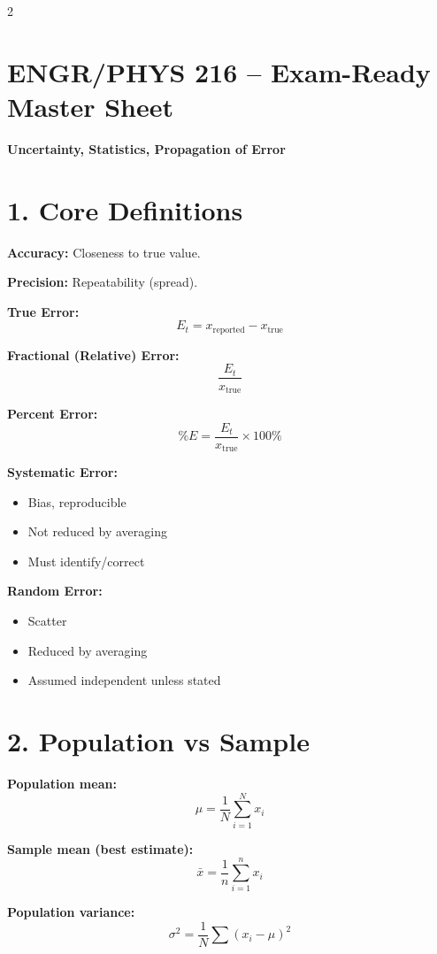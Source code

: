 \documentclass[10pt,landscape]{article}
\begin{document}
\begin{multicols}{2}

\section*{ENGR/PHYS 216 – Exam-Ready Master Sheet}
\textbf{Uncertainty, Statistics, Propagation of Error}

\section*{1. Core Definitions}

\textbf{Accuracy:} Closeness to true value.

\textbf{Precision:} Repeatability (spread).

\textbf{True Error:}
\[
E_t = x_{\text{reported}} - x_{\text{true}}
\]

\textbf{Fractional (Relative) Error:}
\[
\frac{E_t}{x_{\text{true}}}
\]

\textbf{Percent Error:}
\[
\%E = \frac{E_t}{x_{\text{true}}} \times 100\%
\]

\textbf{Systematic Error:}
\begin{itemize}
\item Bias, reproducible
\item Not reduced by averaging
\item Must identify/correct
\end{itemize}

\textbf{Random Error:}
\begin{itemize}
\item Scatter
\item Reduced by averaging
\item Assumed independent unless stated
\end{itemize}

\section*{2. Population vs Sample}

\textbf{Population mean:}
\[
\mu = \frac{1}{N}\sum_{i=1}^{N} x_i
\]

\textbf{Sample mean (best estimate):}
\[
\bar{x} = \frac{1}{n}\sum_{i=1}^{n} x_i
\]

\textbf{Population variance:}
\[
\sigma^2 = \frac{1}{N}\sum (x_i - \mu)^2
\]


\end{multicols}
\end{document}
